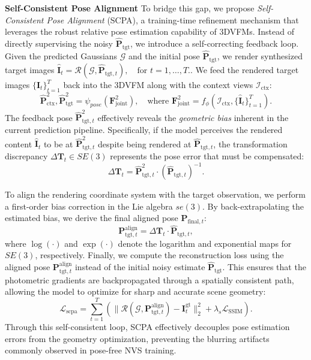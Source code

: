 \noindent \textbf{Self-Consistent Pose Alignment} 
To bridge this gap, we propose \textit{Self-Consistent Pose Alignment} (SCPA), a training-time refinement mechanism that leverages the robust relative pose estimation capability of 3DVFMs.
Instead of directly supervising the noisy $\hat{\mathbf{P}}_{\text{tgt}}$, we introduce a self-correcting feedback loop. 
Given the predicted Gaussians $\mathcal{G}$ and the initial pose $\hat{\mathbf{P}}_{\text{tgt}}$, we render synthesized target images $\hat{\mathbf{I}}_t = \mathcal{R}(\mathcal{G}, \hat{\mathbf{P}}_{\text{tgt},t}), \quad \text{for } t=1, \dots, T.$.
We feed the rendered target images $\{\hat{\mathbf{I}}_t\}_{t=1}^T$ back into the 3DVFM along with the context views $\mathcal{I}_{\text{ctx}}$:
\begin{equation}
    {\hat{\mathbf{P}}_\text{ctx}^2, \hat{\mathbf{P}}_\text{tgt}^2} = \psi_{pose}(\mathbf{F}_\text{joint}^2), \quad \text{where } \mathbf{F}_\text{joint}^2 = f_{\phi}({\mathcal{I}_\text{ctx}, \{\hat{\mathbf{I}}_t\}_{t=1}^T}).
\end{equation}
The feedback pose $\hat{\mathbf{P}}_{\text{tgt}, t}^{2}$ effectively reveals the \textit{geometric bias} inherent in the current prediction pipeline. Specifically, if the model perceives the rendered content $\hat{\mathbf{I}}_t$ to be at $\hat{\mathbf{P}}_{\text{tgt}, t}^{2}$ despite being rendered at $\hat{\mathbf{P}}_{\text{tgt}, t}$, the transformation discrepancy $\Delta \mathbf{T}_t \in SE(3)$ represents the pose error that must be compensated:
\begin{equation}
    \Delta \mathbf{T}_t = \hat{\mathbf{P}}_{\text{tgt}, t}^{2} \cdot (\hat{\mathbf{P}}_{\text{tgt}, t})^{-1}.
\end{equation}

To align the rendering coordinate system with the target observation, we perform a first-order bias correction in the Lie algebra $se(3)$. By back-extrapolating the estimated bias, we derive the final aligned pose $\mathbf{P}_{\text{final}, t}$:
\begin{equation}
    \mathbf{P}_{\text{tgt}, t}^\text{align} = \Delta \mathbf{T}_t \cdot \hat{\mathbf{P}}_{\text{tgt}, t},
\end{equation}
where $\log(\cdot)$ and $\exp(\cdot)$ denote the logarithm and exponential maps for $SE(3)$, respectively.
Finally, we compute the reconstruction loss using the aligned pose $\mathbf{P}_{\text{tgt}, t}^\text{align}$ instead of the initial noisy estimate $\hat{\mathbf{P}}_{\text{tgt}}$. 
This ensures that the photometric gradients are backpropagated through a spatially consistent path, allowing the model to optimize for sharp and accurate scene geometry:
\begin{equation}
    \mathcal{L}_{\text{scpa}} = \sum_{t=1}^{T} \left( \| \mathcal{R}(\mathcal{G}, \mathbf{P}_{\text{tgt}, t}^\text{align}) - \mathbf{I}_t^{\text{gt}} \|_2^2 + \lambda_{s} \mathcal{L}_{\text{SSIM}} \right).
\end{equation}
Through this self-consistent loop, SCPA effectively decouples pose estimation errors from the geometry optimization, preventing the blurring artifacts commonly observed in pose-free NVS training.


